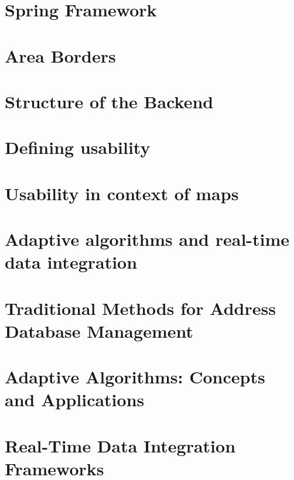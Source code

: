 \section{Spring Framework}


\section{Area Borders}


\section{Structure of the Backend}


\section{Defining usability}


\section{Usability in context of maps}


\section{Adaptive algorithms and real-time data integration}


\section{Traditional Methods for Address Database Management}


\section{Adaptive Algorithms: Concepts and Applications}


\section{Real-Time Data Integration Frameworks}
